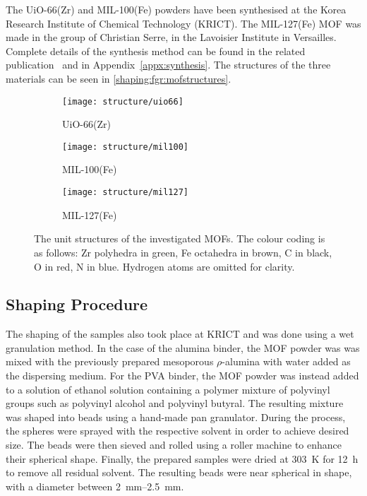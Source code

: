 The UiO-66(Zr) and MIL-100(Fe) powders have been synthesised at the
Korea Research Institute of Chemical Technology (KRICT).
The MIL-127(Fe) MOF was made in the group of Christian Serre,
in the Lavoisier Institute in Versailles.
Complete details of the synthesis method can be found in the related
publication~\cite{valekarShapingPorousMetal2017}
and in Appendix~\ref{appx:synthesis}.
The structures of the three materials can be seen 
in \autoref{shaping:fgr:mofstructures}.


\begin{figure}[htb]
	\centering
	\begin{subfigure}{0.3\textwidth}
		\texttt{[image: structure/uio66]}
		\caption{UiO-66(Zr)}
	\end{subfigure}
	\begin{subfigure}{0.3\textwidth}
		\texttt{[image: structure/mil100]}
		\caption{MIL-100(Fe)}
	\end{subfigure}
	\begin{subfigure}{0.3\textwidth}
		\texttt{[image: structure/mil127]}
		\caption{MIL-127(Fe)}
	\end{subfigure}

	\caption{The unit structures of the investigated MOFs.
		The colour coding is as follows: Zr polyhedra in green,
		Fe octahedra in brown, C in black, O in red, N in blue.
		Hydrogen atoms are omitted for clarity.}%
	\label{shaping:fgr:mofstructures}
\end{figure}




\subsection{Shaping Procedure}

The shaping of the samples also took place at KRICT and was done
using a wet granulation method. In the case of the alumina binder,
the MOF powder was was mixed with the previously prepared mesoporous
\(\rho\)-alumina with water added as the dispersing medium. For the
PVA binder, the MOF powder was instead added to a solution of
ethanol solution containing a polymer mixture of polyvinyl groups
such as polyvinyl alcohol and polyvinyl butyral. The resulting
mixture was shaped into beads using a hand-made pan granulator.
During the process, the spheres were sprayed with the respective
solvent in order to achieve desired size. The beads were then sieved
and rolled using a roller machine to enhance their spherical
shape. Finally, the prepared samples were dried at \SI{303}{\kelvin}
for \SI{12}{\hour} to remove all residual solvent.
The resulting beads were near spherical in shape, with a diameter
between \SIrange{2}{2.5}{\milli\metre}.

